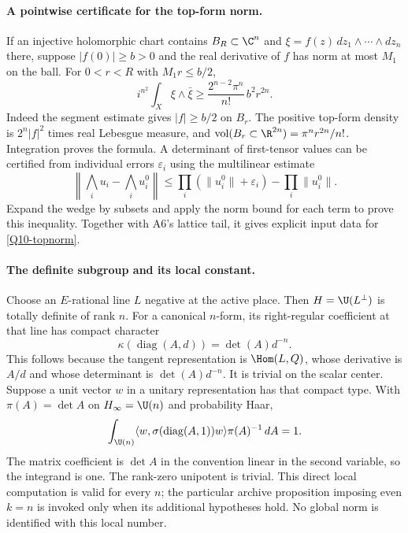 \documentclass[11pt]{article}
\theoremstyle{definition}\newtheorem{definition}[theorem]{Definition}\newtheorem{remark}[theorem]{Remark}
\begin{document}
\paragraph{A pointwise certificate for the top-form norm.}
If an injective holomorphic chart contains $B_R\subset\C^n$ and
$\xi=f(z)\,dz_1\wedge\cdots\wedge dz_n$ there, suppose
$|f(0)|\geq b>0$ and the real derivative of $f$ has norm at most
$M_1$ on the ball. For $0<r<R$ with $M_1r\leq b/2$,
\begin{equation}\label{Q10-topnorm}
 i^{n^2}\int_X\xi\wedge\bar\xi
       \geq \frac{2^{n-2}\pi^n}{n!}\,b^2r^{2n}.
\end{equation}
Indeed the segment estimate gives $|f|\geq b/2$ on $B_r$.
The positive top-form density is $2^n|f|^2$ times real
Lebesgue measure, and
$\operatorname{vol}(B_r\subset\R^{2n})=\pi^nr^{2n}/n!$.
Integration proves the formula. A determinant of first-tensor
values can be certified from individual errors $\varepsilon_i$
using the multilinear estimate
\[
 \left\|\bigwedge_i u_i-\bigwedge_i u_i^0\right\|
 \leq\prod_i(\|u_i^0\|+\varepsilon_i)-\prod_i\|u_i^0\|.
\]
Expand the wedge by subsets and apply the norm bound for each
term to prove this inequality. Together with A6's lattice tail,
it gives explicit input data for \eqref{Q10-topnorm}.

\paragraph{The definite subgroup and its local constant.}
Choose an $E$-rational line $L$ negative at the active place.
Then $H=\U(L^\perp)$ is totally definite of rank $n$. For a
canonical $n$-form, its right-regular coefficient at that line
has compact character
\[
 \kappa(\operatorname{diag}(A,d))=\det(A)d^{-n}.
\]
This follows because the tangent representation is
$\Hom(L,Q)$, whose derivative is $A/d$ and whose determinant
is $\det(A)d^{-n}$. It is trivial on the scalar center.
Suppose a unit vector $w$ in a unitary representation has that
compact type. With $\pi(A)=\det A$ on $H_\infty=\U(n)$ and
probability Haar,
\[
 \int_{\U(n)}
   \langle w,\sigma(\operatorname{diag}(A,1))w\rangle
                      \pi(A)^{-1}\,dA=1.
\]
The matrix coefficient is $\det A$ in the convention linear
in the second variable, so the integrand is one. The rank-zero
unipotent is trivial. This direct local computation is valid
for every $n$; the particular archive proposition imposing
even $k=n$ is invoked only when its additional hypotheses hold.
No global norm is identified with this local number.
\end{document}
